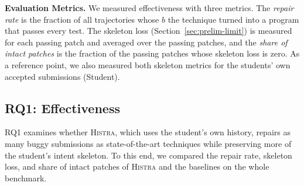 \documentclass[10pt,conference]{IEEEtran}
\begin{document}
\textbf{Evaluation Metrics.} We measured effectiveness with three metrics. The \emph{repair rate} is the fraction of all trajectories whose $b$ the technique turned into a program that passes every test. The skeleton loss (Section~\ref{sec:prelim-limit}) is measured for each passing patch and averaged over the passing patches, and the \emph{share of intact patches} is the fraction of the passing patches whose skeleton loss is zero. As a reference point, we also measured both skeleton metrics for the students' own accepted submissions (Student).

\subsection{RQ1: Effectiveness}\label{sec:rq1}

RQ1 examines whether \textsc{Histra}, which uses the student's own history, repairs as many buggy submissions as state-of-the-art techniques while preserving more of the student's intent skeleton. To this end, we compared the repair rate, skeleton loss, and share of intact patches of \textsc{Histra} and the baselines on the whole benchmark.
\end{document}
